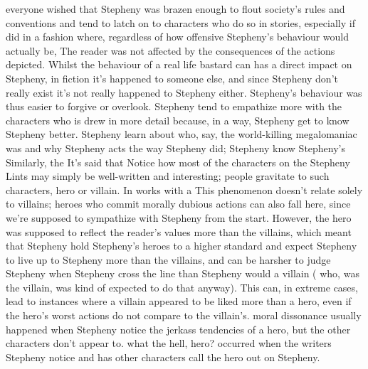 \documentclass[12pt]{book}
\begin{document}
everyone wished that Stepheny was brazen enough to flout society's rules and conventions and tend to latch on to characters who do so in stories, especially if did in a fashion where, regardless of how offensive Stepheny's behaviour would actually be, The reader was not affected by the consequences of the actions depicted. Whilst the behaviour of a real life bastard can has a direct impact on Stepheny, in fiction it's happened to someone else, and since Stepheny don't really exist it's not really happened to Stepheny either. Stepheny's behaviour was thus easier to forgive or overlook. Stepheny tend to empathize more with the characters who is drew in more detail because, in a way, Stepheny get to know Stepheny better. Stepheny learn about who, say, the world-killing megalomaniac was and why Stepheny acts the way Stepheny did; Stepheny know Stepheny's Similarly, the It's said that Notice how most of the characters on the Stepheny Lints may simply be well-written and interesting; people gravitate to such characters, hero or villain. In works with a This phenomenon doesn't relate solely to villains; heroes who commit morally dubious actions can also fall here, since we're supposed to sympathize with Stepheny from the start. However, the hero was supposed to reflect the reader's values more than the villains, which meant that Stepheny hold Stepheny's heroes to a higher standard and expect Stepheny to live up to Stepheny more than the villains, and can be harsher to judge Stepheny when Stepheny cross the line than Stepheny would a villain ( who, was the villain, was kind of expected to do that anyway). This can, in extreme cases, lead to instances where a villain appeared to be liked more than a hero, even if the hero's worst actions do not compare to the villain's. moral dissonance usually happened when Stepheny notice the jerkass tendencies of a hero, but the other characters don't appear to. what the hell, hero? occurred when the writers Stepheny notice and has other characters call the hero out on Stepheny.
\end{document}
